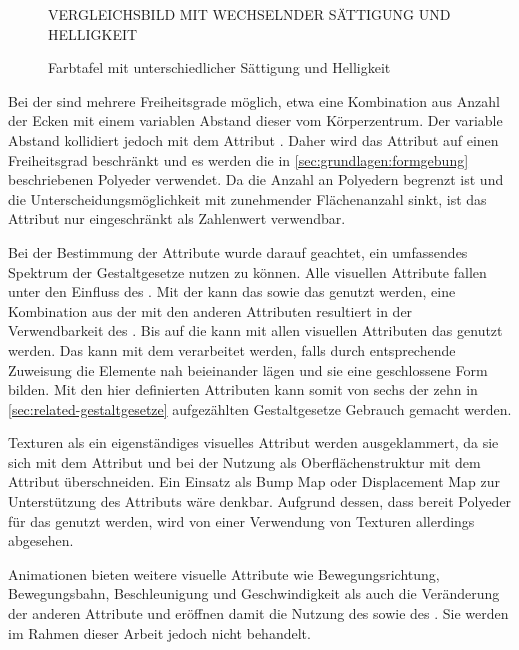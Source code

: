 \begin{figure}
	VERGLEICHSBILD MIT WECHSELNDER SÄTTIGUNG UND HELLIGKEIT
	\caption{Farbtafel mit unterschiedlicher Sättigung und Helligkeit}\label{fig:entwurf:farbtafel}
\end{figure}

Bei der  sind mehrere Freiheitsgrade möglich, etwa eine Kombination aus Anzahl der Ecken mit einem variablen Abstand dieser vom Körperzentrum. Der variable Abstand kollidiert jedoch mit dem Attribut . Daher wird das Attribut  auf einen Freiheitsgrad beschränkt und es werden die in \autoref{sec:grundlagen:formgebung} beschriebenen Polyeder verwendet. Da die Anzahl an Polyedern begrenzt ist und die Unterscheidungsmöglichkeit mit zunehmender Flächenanzahl sinkt, ist das Attribut  nur eingeschränkt als Zahlenwert verwendbar.

Bei der Bestimmung der Attribute wurde darauf geachtet, ein umfassendes Spektrum der Gestaltgesetze nutzen zu können. Alle visuellen Attribute fallen unter den Einfluss des . Mit der  kann das  sowie das  genutzt werden, eine Kombination aus der  mit den anderen Attributen resultiert in der Verwendbarkeit des . Bis auf die  kann mit allen visuellen Attributen das  genutzt werden. Das  kann mit dem  verarbeitet werden, falls durch entsprechende Zuweisung die Elemente nah beieinander lägen und sie eine geschlossene Form bilden. Mit den hier definierten Attributen kann somit von sechs der zehn in \autoref{sec:related-gestaltgesetze} aufgezählten Gestaltgesetze Gebrauch gemacht werden.

Texturen als ein eigenständiges visuelles Attribut werden ausgeklammert, da sie sich mit dem Attribut  und bei der Nutzung als Oberflächenstruktur mit dem Attribut  überschneiden. Ein Einsatz als Bump Map oder Displacement Map zur Unterstützung des Attributs  wäre denkbar. Aufgrund dessen, dass bereit Polyeder für das  genutzt werden, wird von einer Verwendung von Texturen allerdings abgesehen.

Animationen bieten weitere visuelle Attribute wie Bewegungsrichtung, Bewegungsbahn, Beschleunigung und Geschwindigkeit als auch die Veränderung der anderen Attribute und eröffnen damit die Nutzung des  sowie des . Sie werden im Rahmen dieser Arbeit jedoch nicht behandelt.

